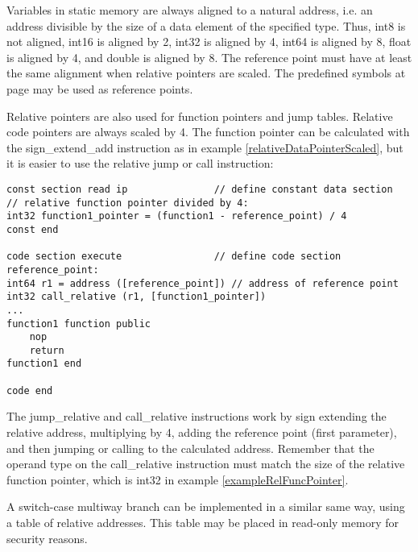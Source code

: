\documentclass[forwardcom.tex]{subfiles}
\begin{document}
Variables in static memory are always aligned to a natural address, i.e. an address divisible by the size of a data element of the specified type. Thus, int8 is not aligned, int16 is aligned by 2, int32 is aligned by 4, int64 is aligned by 8, float is aligned by 4, and double is aligned by 8. The reference point must have at least the same alignment when relative pointers are scaled. The predefined symbols at page \pageref{SpecialAddressSymbols} may be used as reference points.
\vspace{4mm}


Relative pointers are also used for function pointers and jump tables. Relative code pointers are always scaled by 4. The function pointer can be calculated with the sign\_extend\_add instruction as in example \ref{relativeDataPointerScaled}, but it is easier to use the relative jump or call instruction:

\begin{example}
\label{exampleRelFuncPointer}
\end{example}
\begin{lstlisting}[frame=single]
const section read ip               // define constant data section
// relative function pointer divided by 4:
int32 function1_pointer = (function1 - reference_point) / 4
const end

code section execute                // define code section
reference_point:
int64 r1 = address ([reference_point]) // address of reference point
int32 call_relative (r1, [function1_pointer])
...
function1 function public
    nop
    return
function1 end

code end
\end{lstlisting}
\vv

The jump\_relative and call\_relative instructions work by sign extending the relative address, multiplying by 4, adding the reference point (first parameter), and then jumping or calling to the calculated address. Remember that the operand type on the call\_relative instruction must match the size of the relative function pointer, which is int32 in example \ref{exampleRelFuncPointer}.
\vv

A switch-case multiway branch can be implemented in a similar same way, using a table of relative addresses. This table may be placed in read-only memory for security reasons.
\vv
\end{document}

